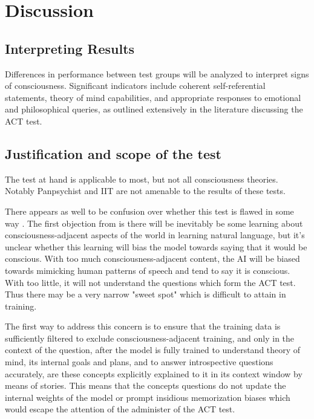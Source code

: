 \documentclass{article}
\begin{document}
\section{Discussion}

\subsection{Interpreting Results}

Differences in performance between test groups will be analyzed to interpret signs of consciousness. Significant indicators include coherent self-referential statements, theory of mind capabilities, and appropriate responses to emotional and philosophical queries, as outlined extensively in the literature discussing the ACT test.

\subsection{Justification and scope of the test}

The test at hand is applicable to most, but not all consciousness theories. Notably Panpsychist and IIT are not amenable to the results of these tests.

There appears as well to be confusion over whether this test is flawed in some way \citep{udell2021schneider}. The first objection from \citep{udell2021schneider} is there will be inevitably be some learning about consciousness-adjacent aspects of the world in learning natural language, but it's unclear whether this learning will bias the model towards saying that it would be conscious. With too much consciousness-adjacent content, the AI will be biased towards mimicking human patterns of speech and tend to say it is conscious. With too little, it will not understand the questions which form the ACT test. Thus there may be a very narrow "sweet spot" which is difficult to attain in training.

The first way to address this concern is to ensure that the training data is sufficiently filtered to exclude consciousness-adjacent training, and only in the context of the question, after the model is fully trained to understand theory of mind, its internal goals and plans, and to answer introspective questions accurately, are these concepts explicitly explained to it in its context window by means of stories. This means that the concepts questions do not update the internal weights of the model or prompt insidious memorization biases which would escape the attention of the administer of the ACT test.
\end{document}
